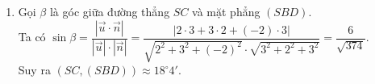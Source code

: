 \begin{vd}
{\begin{enumerate}
			Mặt phẳng $(SBD)$ có vectơ pháp tuyến $\overrightarrow{n}=(3;2;3)$, mặt đáy $(ABCD)$ có vectơ pháp tuyến $\overrightarrow{k}=(0;0;1)$. Gọi $\alpha$ là góc giữa mặt phẳng $(SBD)$ và mặt đáy.\\
			Ta có $\cos\alpha =\dfrac{\left |\overrightarrow{n}\cdot\overrightarrow{k} \right |}{\left |\overrightarrow{n} \right |\cdot\left |\overrightarrow{k} \right |}=\dfrac{\left |3\cdot 0+2\cdot 0+3\cdot 1 \right |}{\sqrt{3^2+2^2+3^2}\cdot\sqrt{0^2+0^2+1^2}}=\dfrac{3}{\sqrt{22}}$.\\
			Suy ra $\left ((SBD),(ABCD) \right )\approx 50^{\circ}14'$.
			\item Gọi $\beta$ là góc giữa đường thẳng $SC$ và mặt phẳng $(SBD)$.\\
			Ta có $\sin\beta =\dfrac{\left |\overrightarrow{u}\cdot\overrightarrow{n} \right |}{\left |\overrightarrow{u} \right |\cdot\left |\overrightarrow{n} \right |}=\dfrac{\left |2\cdot 3+3\cdot 2+(-2)\cdot 3 \right |}{\sqrt{2^2+3^2+(-2)^2}\cdot\sqrt{3^2+2^2+3^2}}=\dfrac{6}{\sqrt{374}}$.\\
			Suy ra $\left (SC,(SBD) \right )\approx 18^{\circ}4'$.
		\end{enumerate}
	}
\end{vd}

